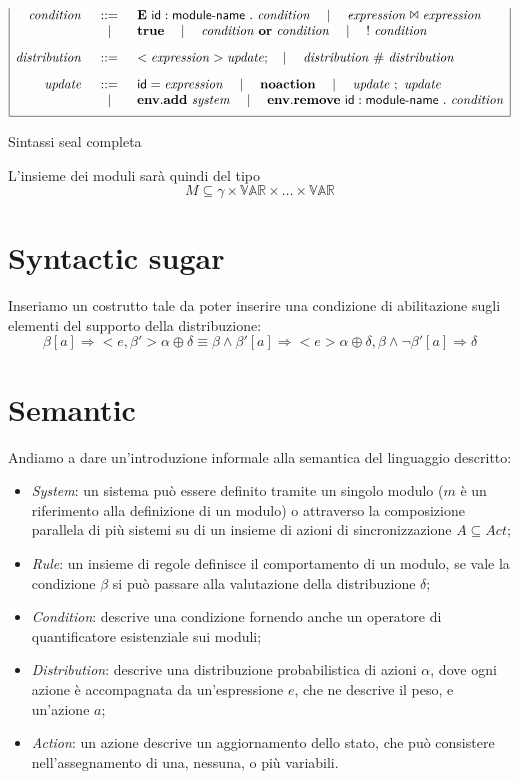 \begin{table}
$$\begin{array}{|rcl|}
\mathit{condition} &::=& \mathbf{E} \mbox{ } {\sf id}:{\sf module}\textrm{-}{\sf name} \mbox{ } . \mbox{ } \mathit{condition} \quad\mid\quad \mathit{expression} \Join \mathit{expression} \\
	& \quad\mid\quad & \mathbf{true} \quad\mid\quad \mathit{condition} \mbox{ } \mathbf{or} \mbox{ } \mathit{condition} \quad\mid\quad {\sf !} \mbox{ } \mathit{condition}
	\\[.3cm]
\mathit{distribution} &::=& <\mathit{expression}> \mathit{update}; \quad\mid\quad \mathit{distribution} \mbox{ } \# \mbox{ } \mathit{distribution}
	\\[.3cm]
\mathit{update} &::=& {\sf id} = \mathit{expression} \quad\mid\quad \mathbf{noaction} \quad\mid\quad \mathit{update} \mbox{ } ; \mbox{ } \mathit{update} \\
	& \quad\mid\quad & \mathbf{env.add} \mbox{ } \mathit{system} \quad\mid\quad \mathbf{env.remove} \mbox{ } {\sf id}:{\sf module}\textrm{-}{\sf name} \mbox{ } . \mbox{ } \mathit{condition} 
	\\[.2cm]
\hline
\end{array}
$$
\label{tab:sealsyntax}
\caption{Sintassi \ac{seal} completa}
\end{table}

L'insieme dei moduli sarà quindi del tipo
$$ M \subseteq \gamma \times \mathbb{VAR} \times \dots \times \mathbb{VAR} $$

\section{Syntactic sugar}
Inseriamo un costrutto tale da poter inserire una condizione di abilitazione sugli elementi del supporto della distribuzione:
$$
\beta [a]\Rightarrow <e,\beta'> \alpha \oplus \delta
\equiv 
\beta \wedge \beta' [a]\Rightarrow <e> \alpha \oplus \delta,
\beta \wedge \neg\beta' [a]\Rightarrow \delta
$$

\section{Semantic}
Andiamo a dare un'introduzione informale alla semantica del linguaggio descritto:
\begin{itemize}
	\item \emph{System}: un sistema può essere definito tramite un singolo modulo ($m$ è un riferimento alla definizione di un modulo) o attraverso la composizione parallela di più sistemi su di un insieme di azioni di sincronizzazione $A \subseteq Act$;
	\item \emph{Rule}: un insieme di regole definisce il comportamento di un modulo, se vale la condizione $\beta$ si può passare alla valutazione della distribuzione $\delta$;
	\item \emph{Condition}: descrive una condizione fornendo anche un operatore di quantificatore esistenziale sui moduli;
	\item \emph{Distribution}: descrive una distribuzione probabilistica di azioni $\alpha$, dove ogni azione è accompagnata da un'espressione $e$, che ne descrive il peso, e un'azione $a$;
	\item \emph{Action}: un azione descrive un aggiornamento dello stato, che può consistere nell'assegnamento di una, nessuna, o più variabili.
\end{itemize}

